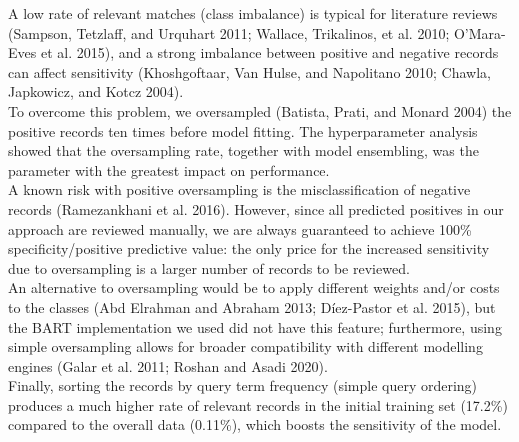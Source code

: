 \documentclass{article}
\begin{document}
A low rate of relevant matches (class imbalance) is typical for
literature reviews (Sampson, Tetzlaff, and Urquhart 2011; Wallace,
Trikalinos, et al. 2010; O'Mara-Eves et al. 2015), and a strong
imbalance between positive and negative records can affect sensitivity
(Khoshgoftaar, Van Hulse, and Napolitano 2010; Chawla, Japkowicz, and
Kotcz 2004).\\
To overcome this problem, we oversampled (Batista, Prati, and Monard
2004) the positive records ten times before model fitting. The
hyperparameter analysis showed that the oversampling rate, together with
model ensembling, was the parameter with the greatest impact on
performance.\\
A known risk with positive oversampling is the misclassification of
negative records (Ramezankhani et al. 2016). However, since all
predicted positives in our approach are reviewed manually, we are always
guaranteed to achieve 100\% specificity/positive predictive value: the
only price for the increased sensitivity due to oversampling is a larger
number of records to be reviewed.\\
An alternative to oversampling would be to apply different weights
and/or costs to the classes (Abd Elrahman and Abraham 2013; Díez-Pastor
et al. 2015), but the BART implementation we used did not have this
feature; furthermore, using simple oversampling allows for broader
compatibility with different modelling engines (Galar et al. 2011;
Roshan and Asadi 2020).\\
Finally, sorting the records by query term frequency (simple query
ordering) produces a much higher rate of relevant records in the initial
training set (17.2\%) compared to the overall data (0.11\%), which
boosts the sensitivity of the model.\\
\end{document}

